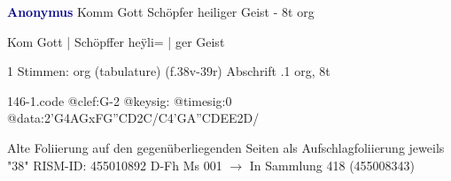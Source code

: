\documentclass[twocolumn]{book}
\begin{document}
\newline \par \vspace{7pt} \textcolor{darkblue}{\textbf{Anonymus  }}
\newline Komm Gott Schöpfer heiliger Geist - 8t
\newline org
\newline \begin{itshape}[f.38v, at left:] Kom Gott | Schöpffer heÿli= | ger Geist\end{itshape} 
\newline \textcolor{darkblue}{}  1 Stimmen: org (tabulature)  (f.38v-39r)
\newline Abschrift
.1  org, 8t  
\begin{filecontents*}{146-1.code}
@clef:G-2
@keysig:
@timesig:0
@data:2'G4AGxFG''CD2C/C4'GA''CDEE2D/
\end{filecontents*}
\newline
%
\newline Alte Foliierung auf den gegenüberliegenden Seiten als Aufschlagfoliierung jeweils "38"
\newline RISM-ID: 455010892
\newline D-Fh  Ms 001
\newline $\rightarrow$ In Sammlung 418 (455008343)
      
\end{document}
